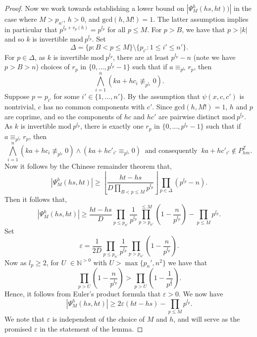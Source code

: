 \documentclass[letterpaper]{amsart}
\newcommand{\nn}{\mathbb{N}}
\newcommand{\zz}{\mathbb{Z}}
\begin{document}
\begin{proof}
Now we work towards establishing a lower bound on $|\Psi^h_{M}(hs,ht))|$ in the case where $M> p_{n'} $, $h > 0$, and $\text{gcd}(h, M!)=1$. The latter assumption implies in particular that $p^{l_p + v_p(h)} = p^{l_p}$ for all $p \leq M$. For $p>B $, we have that $p>|k|$ and so $k$ is invertible $\mathrm{mod}\ p^{l_p}$.
Set $$\Delta = \{p :  B < p \leq M\}\setminus \{ p_{i'} : 1 \leq i' \leq n'  \}.$$ 
For  $p\in \Delta$, as $k$ is invertible $\mathrm{mod}\ p^{l_p}$, there are at least $p^{l_{p}}- n$ (note we have $p>B>n$) choices of $r_p$  in $\{0, \ldots, p^{l_{p}}-1 \}$ such that  if $ a \equiv_{p^{l_p}} r_{p}$, then
$$ \bigwedge_{i=1}^n  (ka+hc_i \not \equiv_{p^{l_p}} 0). $$ 
Suppose $p = p_{i'}$ for some $i' \in \{1, \ldots, n'\}$. By the assumption that $\psi(x,c,c')$ is nontrivial, $c$ has no common components with $c'$. Since $\text{gcd}(h, M!)=1$,  $h$ and $p$ are coprime, and so the components of $hc$ and $hc'$ are pairwise distinct $\mathrm{mod}\ p^{l_p}$. As $k$ is invertible $\mathrm{mod}\ p^{l_p}$, there is exactly one  $r_p$ in  $\{ 0, \ldots, p^{l_{p}}-1 \}$ such that if $a \equiv_{p^{l_p}} r_p$, then
$$  \bigwedge_{i=1}^n (ka+hc_i \not \equiv_{p^{l_p}} 0) \wedge (ka+hc'_{i'} \equiv_{p^{l_p}} 0)  \ \text{ and consequently }\  ka+hc'_{i'} \notin P_{hm}^{\zz}  .$$
Now it follows by the Chinese remainder theorem that,
$$|\Psi^h_{M}(hs,ht)|\geq \left\lfloor \frac{ht-hs}{D\prod_{B<p\leq M} p^{l_p}} \right\rfloor \prod_{p \in \Delta}\left(p^{l_p}-n\right).$$
Then it follows that,
$$|\Psi^h_{M}(hs,ht)|\geq \frac{ht-hs}{D}\prod_{p \leq p_{n'}}\frac{1}{p^{l_p}}\prod_{p> p_{n'}}^{\leq M} \left(1-\frac{n}{p^{l_p}}\right) - \prod_{p\leq M} p^{l_p}. $$
Set
$$\varepsilon = \frac{1}{2D}\prod_{p \leq p_{n'}}\frac{1}{p^{l_p}}\prod_{p > p_{n'}} \left(1-\frac{n}{p^{l_p}}\right).$$
Now as $l_p \geq 2$, for $U$ $\in \nn^{>0}$ with $U>\max\{p_{n}',n^2\}$ we have that
$$\prod_{p > U} \left(1-\frac{n}{p^{l_p}}\right)>\prod_{p>U}\left(1-\frac{1}{p^{\frac{3}{2}}}\right).$$
Hence, it follows from  Euler's product formula that $\varepsilon>0$. We now have 
$$|\Psi^h_{M}(hs,ht)| \geq 2\varepsilon(ht-hs) - \prod_{p\leq M} p^{l_p}.$$ 
We note that $\varepsilon$ is independent of the choice of $M$ and $h$, and will serve as the promised $\varepsilon$ in the statement of the lemma.


\end{proof}
\end{document}
